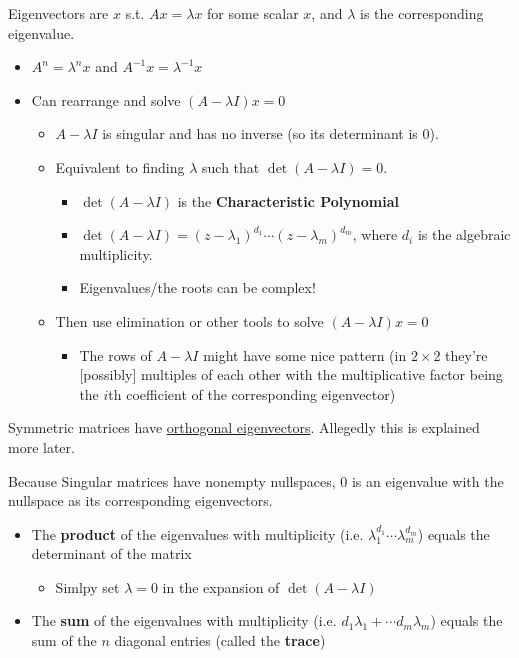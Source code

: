 \documentclass[12pt]{article} %
\begin{document}
Eigenvectors are $x$ s.t. $Ax = \lambda x$ for some scalar $x$, and $\lambda$ is the corresponding eigenvalue.
\begin{itemize}[topsep=-1pt,itemsep=-1pt]
    \item $A^n = \lambda^nx$ and $A^{-1}x = \lambda^{-1}x$
    \item Can rearrange and solve $(A-\lambda I)x = 0$
    \begin{itemize}[topsep=-1pt,itemsep=-1pt]
    \item $A-\lambda I$ is singular and has no inverse (so its determinant is 0).
    \item Equivalent to finding $\lambda$ such that $\det(A-\lambda I) = 0$.
        \begin{itemize}[topsep=-1pt,itemsep=-1pt]
            \item $\det(A-\lambda I)$ is the \textbf{Characteristic Polynomial}
            \item $\det(A-\lambda I) = (z-\lambda_1)^{d_1}\cdots (z-\lambda_m)^{d_m}$, where $d_i$ is the algebraic multiplicity.
            \item Eigenvalues/the roots can be complex!
        \end{itemize}
    \item Then use elimination or other tools to solve $(A-\lambda I)x = 0$
    \begin{itemize}[topsep=-1pt,itemsep=-1pt]
            \item The rows of $A-\lambda I$ might have some nice pattern (in $2\times2$ they're [possibly] multiples of each other with the multiplicative factor being the $i$th coefficient of the corresponding eigenvector)
    \end{itemize}
    \end{itemize}

\end{itemize}
Symmetric matrices have \href{https://math.stackexchange.com/questions/82467/eigenvectors-of-real-symmetric-matrices-are-orthogonal}{orthogonal eigenvectors}. Allegedly this is explained more later.

Because Singular matrices have nonempty nullspaces, $0$ is an eigenvalue with the nullspace as its corresponding eigenvectors.

\begin{itemize}[topsep=-1pt,itemsep=-1pt]
    \item The \textbf{product} of the eigenvalues with multiplicity (i.e. $\lambda_1^{d_1}\cdots\lambda_m^{d_m}$) equals the determinant of the matrix
    \begin{itemize}[topsep=-1pt,itemsep=-1pt]
            \item Simlpy set $\lambda = 0$ in the expansion of $\det(A-\lambda I)$
    \end{itemize}
    \item The \textbf{sum} of the eigenvalues with multiplicity (i.e. $d_1\lambda_1 + \cdots d_m\lambda_m$) equals the sum of the $n$ diagonal entries (called the \textbf{trace})
\end{itemize}
\end{document}
